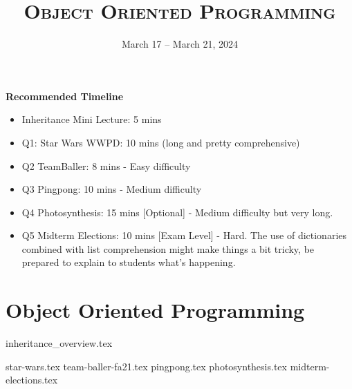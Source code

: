 \documentclass{exam}
\title{\textsc{Object Oriented Programming}}
\date{March 17 -- March 21, 2024}
\begin{document}
\maketitle
\begin{guide}
    \textbf{Recommended Timeline}
    \begin{itemize}
       \item Inheritance Mini Lecture: 5 mins
       \item Q1: Star Wars WWPD: 10 mins (long and pretty comprehensive)
       \item Q2 TeamBaller: 8 mins - Easy difficulty
       \item Q3 Pingpong: 10 mins - Medium difficulty
       \item Q4 Photosynthesis: 15 mins [Optional] - Medium difficulty but very long.
       \item Q5 Midterm Elections: 10 mins [Exam Level] - Hard. The use of dictionaries combined with list comprehension might make things a bit tricky, be prepared to explain to students what's happening.
    \end{itemize}
\end{guide}


\section{Object Oriented Programming}
{inheritance_overview.tex}


\begin{questions}
    {star-wars.tex}
    {team-baller-fa21.tex}
    {pingpong.tex}
    {photosynthesis.tex}
    {midterm-elections.tex}
\end{questions}
\end{document}
